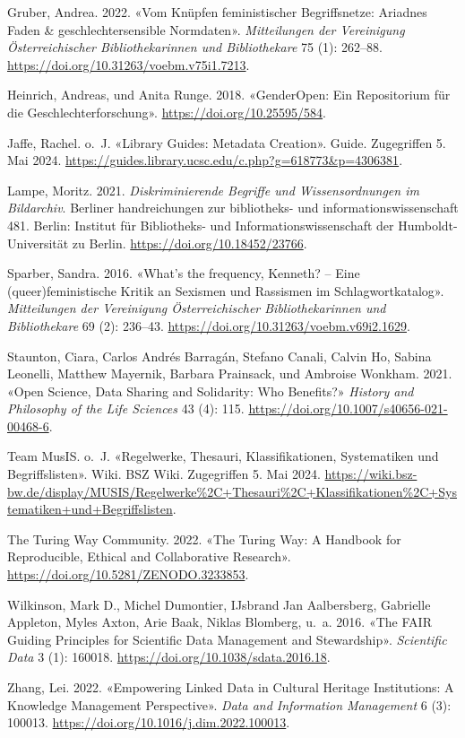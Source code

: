 \documentclass[
  letterpaper,
  DIV=11,
  numbers=noendperiod,
  landscape,
  a4paper,
  geometry:margin=1in]{scrartcl}
\newlength{\cslhangindent}
\newenvironment{CSLReferences}[2] %
 {\begin{list}{}{%
  \setlength{\itemindent}{0pt}
  \setlength{\leftmargin}{0pt}
  \setlength{\parsep}{0pt}
  \ifodd #1
   \setlength{\leftmargin}{\cslhangindent}
   \setlength{\itemindent}{-1\cslhangindent}
  \fi
  \setlength{\itemsep}{#2\baselineskip}}}
 {\end{list}}
\begin{document}
\begin{CSLReferences}{1}{0}
Gruber, Andrea. 2022. {«Vom Knüpfen feministischer Begriffsnetze:
Ariadnes Faden \& geschlechtersensible Normdaten»}. \emph{Mitteilungen
der Vereinigung Österreichischer Bibliothekarinnen und Bibliothekare} 75
(1): 262--88. \url{https://doi.org/10.31263/voebm.v75i1.7213}.

Heinrich, Andreas, und Anita Runge. 2018. {«GenderOpen: Ein Repositorium
für die Geschlechterforschung»}. \url{https://doi.org/10.25595/584}.

Jaffe, Rachel. o.~J. {«Library {Guides}: {Metadata Creation}»}. Guide.
Zugegriffen 5. Mai 2024.
\url{https://guides.library.ucsc.edu/c.php?g=618773&p=4306381}.

Lampe, Moritz. 2021. \emph{Diskriminierende Begriffe und
Wissensordnungen im Bildarchiv}. Berliner handreichungen zur
bibliotheks- und informationswissenschaft 481. Berlin: Institut für
Bibliotheks- und Informationswissenschaft der Humboldt-Universität zu
Berlin. \url{https://doi.org/10.18452/23766}.

Sparber, Sandra. 2016. {«What's the frequency, Kenneth? -- Eine
(queer)feministische Kritik an Sexismen und Rassismen im
Schlagwortkatalog»}. \emph{Mitteilungen der Vereinigung Österreichischer
Bibliothekarinnen und Bibliothekare} 69 (2): 236--43.
\url{https://doi.org/10.31263/voebm.v69i2.1629}.

Staunton, Ciara, Carlos Andrés Barragán, Stefano Canali, Calvin Ho,
Sabina Leonelli, Matthew Mayernik, Barbara Prainsack, und Ambroise
Wonkham. 2021. {«Open Science, Data Sharing and Solidarity: Who
Benefits?»} \emph{History and Philosophy of the Life Sciences} 43 (4):
115. \url{https://doi.org/10.1007/s40656-021-00468-6}.

Team MusIS. o.~J. {«Regelwerke, Thesauri, Klassifikationen, Systematiken
und Begriffslisten»}. Wiki. BSZ Wiki. Zugegriffen 5. Mai 2024.
\url{https://wiki.bsz-bw.de/display/MUSIS/Regelwerke\%2C+Thesauri\%2C+Klassifikationen\%2C+Systematiken+und+Begriffslisten}.

The Turing Way Community. 2022. {«The {Turing Way}: {A} Handbook for
Reproducible, Ethical and Collaborative Research»}.
\url{https://doi.org/10.5281/ZENODO.3233853}.

Wilkinson, Mark D., Michel Dumontier, IJsbrand Jan Aalbersberg,
Gabrielle Appleton, Myles Axton, Arie Baak, Niklas Blomberg, u.~a. 2016.
{«The {FAIR Guiding Principles} for Scientific Data Management and
Stewardship»}. \emph{Scientific Data} 3 (1): 160018.
\url{https://doi.org/10.1038/sdata.2016.18}.

Zhang, Lei. 2022. {«Empowering Linked Data in Cultural Heritage
Institutions: {A} Knowledge Management Perspective»}. \emph{Data and
Information Management} 6 (3): 100013.
\url{https://doi.org/10.1016/j.dim.2022.100013}.

\end{CSLReferences}
\end{document}
